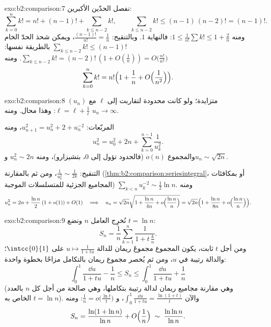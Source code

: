 \begin{solution}{exo:b2:comparison:7}
نفصل الحدّين الأكبرين:
\[
\sum_{k=0}^{n} k! = n! + (n-1)! + \sum_{k \leq n-2} k! ,
\qquad
\sum_{k\leq n-2} k! \leq (n-1)\,(n-2)! = (n-1)! .
\]
ومنه $1 \leq \frac{1}{n!}\sum k! \leq 1 + \frac{2}{n}$: فالنهاية
$1$. وبالتنقيح: $\frac{(n-1)!}{n!} = \frac1n$، ويمكن شحذ الحدّ الخام
$\sum_{k \leq n-2}k! \leq (n-1)!$ بالطريقة نفسها:
$\sum_{k\leq n-2} k! = (n-2)!\,(1 + O(\frac1n)) = O\bigl(\frac{n!}{n^2}\bigr)$.
ومنه
\[
\sum_{k=0}^{n} k! = n!\Bigl(1 + \frac1n + O\Bigl(\frac{1}{n^2}\Bigr)\Bigr).
\]
\end{solution}

\begin{solution}{exo:b2:comparison:8}
$(u_n)$ متزايدة؛ ولو كانت محدودة لتقاربت إلى $\ell$ مع
$\ell = \ell + \frac1\ell$: وهذا محال. ومنه $u_n \to \infty$.

المربّعات: $u_{n+1}^2 = u_n^2 + 2 + u_n^{-2}$، ومنه
\[
u_n^2 = u_0^2 + 2n + \sum_{k=0}^{n-1} \frac{1}{u_k^2} .
\]
والمجموع $o(n)$ (فالحدود تؤول إلى $0$، بتشيزارو)، ومنه $u_n^2 \sim 2n$
و$u_n \sim \sqrt{2n}$.

التنقيح: $\frac{1}{u_k^2} \sim \frac{1}{2k}$، ومن ثم بالمقارنة
(\cref{thm:b2:comparison:seriesintegral}، أو بمكافئات المجاميع
الجزئية للمتسلسلات الموجبة) $\sum_{k<n} u_k^{-2} \sim \frac12 \ln n$.
ومنه
\[
u_n^2 = 2n + \frac{\ln n}{2}\,(1 + o(1)) + O(1)
\quad\Longrightarrow\quad
u_n = \sqrt{2n}\sqrt{1 + \frac{\ln n}{4n} + o\Bigl(\frac{\ln
n}{n}\Bigr)}
= \sqrt{2n}\Bigl(1 + \frac{\ln n}{8n} + o\Bigl(\frac{\ln
n}{n}\Bigr)\Bigr).
\]
\end{solution}

\begin{solution}{exo:b2:comparison:9}
نُخرِج العامل $n$ ونضع $t = \ln n$:
\[
S_n = \frac1n \sum_{k=1}^{n} \frac{1}{1 + t\,\frac kn} .
\]
ومن أجل $t$ ثابت، يكون المجموع مجموعَ ريمان للدالة $u \mapsto \frac{1}{1 +
tu}$ على $\intcc{0}{1}$؛ والدالة رتيبة في $u$، ومن ثم
يُحصر مجموع ريمان بالتكامل مزاحًا بخطوة واحدة:
\[
\int_0^1 \frac{\dd u}{1 + tu} - \frac1n
\leq S_n \leq \int_0^1 \frac{\dd u}{1 + tu} + \frac1n
\]
(وهي مقارنة مجاميع ريمان لدالة رتيبة بتكاملها،
وهي صالحة من أجل كل $n$ بالعدد $t = \ln n$ الخاص به). والآن
$\int_0^1 \frac{\dd u}{1 + tu} = \frac{\ln(1 + t)}{t}$، و
$\frac1n = o\bigl(\frac{\ln t}{t}\bigr)$: ومنه
\[
S_n = \frac{\ln(1 + \ln n)}{\ln n} + O\Bigl(\frac 1n\Bigr)
\;\sim\; \frac{\ln\ln n}{\ln n} .
\]
\end{solution}

